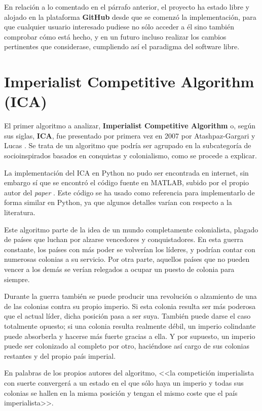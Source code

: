 En relación a lo comentado en el párrafo anterior, el proyecto ha estado libre y alojado en la plataforma \textbf{GitHub} \cite{repositorio-tfg} desde que se comenzó la implementación, para que cualquier usuario interesado pudiese no sólo acceder a él sino también comprobar cómo está hecho, y en un futuro incluso realizar los cambios pertinentes que considerase, cumpliendo así el paradigma del software libre.

\section{Imperialist Competitive Algorithm (ICA)}

El primer algoritmo a analizar, \textbf{Imperialist Competitive Algorithm} o, según sus siglas, \textbf{ICA}, fue presentado por primera vez en 2007 por Atashpaz-Gargari y Lucas \cite{ica-conference}. Se trata de un algoritmo que podría ser agrupado en la subcategoría de socioinspirados basados en conquistas y colonialismo, como se procede a explicar.

La implementación del ICA en Python no pudo ser encontrada en internet, sin embargo sí que se encontró el código fuente en MATLAB, subido por el propio autor del \textit{paper} \cite{ica-matlab}. Este código se ha usado como referencia para implementarlo de forma similar en Python, ya que algunos detalles varían con respecto a la literatura.

Este algoritmo parte de la idea de un mundo completamente colonialista, plagado de países que luchan por alzarse vencedores y conquistadores. En esta guerra constante, los países con más poder se volverían los líderes, y podrían contar con numerosas colonias a su servicio. Por otra parte, aquellos países que no pueden vencer a los demás se verían relegados a ocupar un puesto de colonia para siempre.

Durante la guerra también se puede producir una revolución o alzamiento de una de las colonias contra su propio imperio. Si esta colonia resulta ser más poderosa que el actual líder, dicha posición pasa a ser suya. También puede darse el caso totalmente opuesto; si una colonia resulta realmente débil, un imperio colindante puede absorberla y hacerse más fuerte gracias a ella. Y por supuesto, un imperio puede ser colonizado al completo por otro, haciéndose así cargo de sus colonias restantes y del propio país imperial.

En palabras de los propios autores del algoritmo, <<la competición imperialista con suerte convergerá a un estado en el que sólo haya un imperio y todas sus colonias se hallen en la misma posición y tengan el mismo coste que el país imperialista>>.

